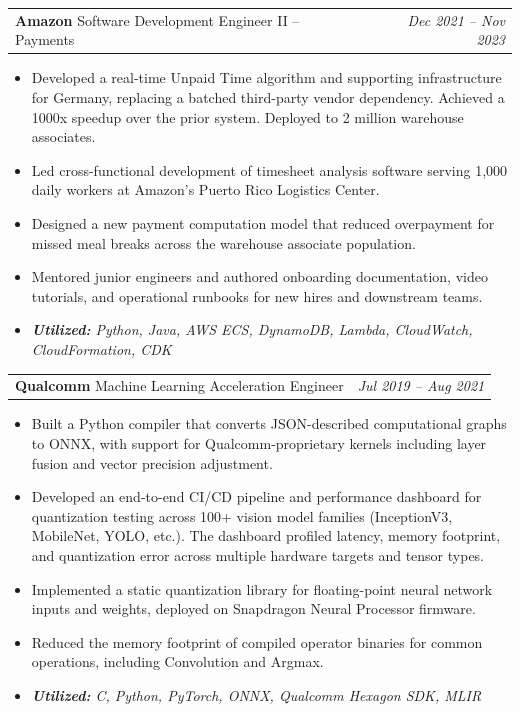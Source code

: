\documentclass[letterpaper,10pt]{article}
\makeatletter
\newcommand{\resitem}[1]{\item #1 \vspace{0pt}}
\newcommand{\ressubheading}[4]{
\begin{tabular*}{7in}{l@{\extracolsep{\fill}}r}
		\textbf{#1} #2 & \textit{#4} \\
\end{tabular*}\vspace{0pt}}
\makeatother
\begin{document}
    \ressubheading{Amazon}{Software Development Engineer II -- Payments}{}{Dec 2021 -- Nov 2023}
	\begin{itemize} \vspace{-\topsep}
    \setlength{\parskip}{0pt}
    \setlength{\itemsep}{0pt}
    \resitem{Developed a real-time Unpaid Time algorithm and supporting infrastructure for Germany, replacing a batched third-party vendor dependency. Achieved a 1000x speedup over the prior system. Deployed to 2 million warehouse associates.}
    \resitem{Led cross-functional development of timesheet analysis software serving 1,000 daily workers at Amazon's Puerto Rico Logistics Center.}
    \resitem{Designed a new payment computation model that reduced overpayment for missed meal breaks across the warehouse associate population.}
    \resitem{Mentored junior engineers and authored onboarding documentation, video tutorials, and operational runbooks for new hires and downstream teams.}
    \resitem{\textsl{\textbf{Utilized:} Python, Java, AWS ECS, DynamoDB, Lambda, CloudWatch, CloudFormation, CDK}}
     \end{itemize}
\ressubheading{Qualcomm}{Machine Learning Acceleration Engineer}{}{Jul 2019 -- Aug 2021}
	\begin{itemize} \vspace{-\topsep}
    \setlength{\parskip}{0pt}
    \setlength{\itemsep}{0pt}
    \resitem{Built a Python compiler that converts JSON-described computational graphs to ONNX, with support for Qualcomm-proprietary kernels including layer fusion and vector precision adjustment.}
    \resitem{Developed an end-to-end CI/CD pipeline and performance dashboard for quantization testing across 100+ vision model families (InceptionV3, MobileNet, YOLO, etc.). The dashboard profiled latency, memory footprint, and quantization error across multiple hardware targets and tensor types.}
    \resitem{Implemented a static quantization library for floating-point neural network inputs and weights, deployed on Snapdragon Neural Processor firmware.}
    \resitem{Reduced the memory footprint of compiled operator binaries for common operations, including Convolution and Argmax.}
    \resitem{\textsl{\textbf{Utilized:} C, Python, PyTorch, ONNX, Qualcomm Hexagon SDK, MLIR}}
    \end{itemize}
    
\end{document}
